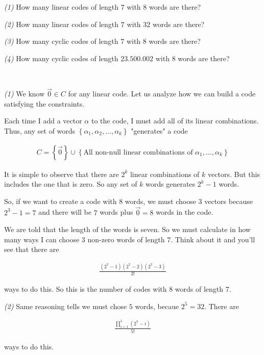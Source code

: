 \documentclass[a4paper, 12pt]{article}
\begin{document}
\textit{(1)} How many linear codes of length $7$ with $8$ words are there?

\textit{(2)} How many linear codes of length $7$ with $32$ words are there?

\textit{(3)} How many cyclic codes of length $7$ with $8$ words are there?

\textit{(4)} How many cyclic codes of length $23.500.002$ with $8$ words are there?

~

\textit{(1)} We know $\overrightarrow{0} \in C$ for any linear code. Let us analyze how we can build 
a code satisfying the constraints.

Each time I add a vector $\alpha$ to the code, I must add all of its linear combinations.
Thus, any set of words $\left\{ \alpha_1, \alpha_2, \ldots, \alpha_k \right\} $ "generates"
a code 

\begin{align*}
    C = \left\{ \overrightarrow{0} \right\} \cup \left\{ \text{All non-null linear combinations of } \alpha_1, \ldots, \alpha_k \right\} 
\end{align*}

It is simple to observe that there are $2^k$ linear combinations of $k$
vectors. But this includes the one that is zero. So any set of $k$ words
generates $2^{k} - 1$ words.

So, if we want to create a code with $8$ words, we must choose $3$ vectors because 
$2^3 - 1 = 7$ and there will be $7$ words plus $\overrightarrow{0} = 8$  words 
in the code. 

We are told that the length of the words is seven. So we must calculate 
in how many ways I can choose $3$ non-zero words of length $7$. Think about it 
and you'll see that there are 

\begin{align*}
    \frac{ \left( 2^7 - 1 \right) (2^7 - 2) \left( 2^7 - 3 \right)  }{3!}
\end{align*}

ways to do this. So this is the number of codes with $8$ words of 
length $7$.

\textit{(2)} Same reasoning tells we must chose $5$ words, becaue $2^5 = 32$.
There are 

\begin{align*}
    \frac{ \prod_{i=1}^{5} \left( 2^7 - i \right)  }{5!}
\end{align*}

ways to do this.
\end{document}
